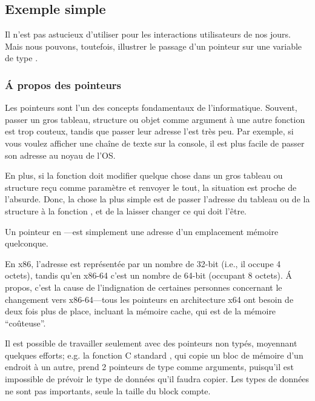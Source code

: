 \subsection{Exemple simple}



Il n'est pas astucieux d'utiliser \scanf pour les interactions utilisateurs de nos jours.
Mais nous pouvons, toutefois, illustrer le passage d'un pointeur sur une variable
de type \Tint.

\subsubsection{Á propos des pointeurs}
\myindex{\CLanguageElements!\Pointers}

Les pointeurs sont l'un des concepts fondamentaux de l'informatique.
Souvent, passer un gros tableau, structure ou objet comme argument à une autre fonction
est trop couteux, tandis que passer leur adresse l'est très peu.
Par exemple, si vous voulez afficher une chaîne de texte sur la console, il est
plus facile de passer son adresse au noyau de l'\ac{OS}.

En plus, si la fonction  doit modifier quelque chose dans
un gros tableau ou structure reçu comme paramètre et renvoyer le tout, la situation
est proche de l'absurde.
Donc, la chose la plus simple est de passer l'adresse du tableau ou de la structure
à la fonction , et de la laisser changer ce qui doit l'être.

Un pointeur en \CCpp---est simplement une adresse d'un emplacement mémoire quelconque.

En x86, l'adresse est représentée par un nombre de 32-bit (i.e., il occupe 4 octets),
tandis qu'en x86-64 c'est un nombre de 64-bit (occupant 8 octets).
Á propos, c'est la cause de l'indignation de certaines personnes concernant le
changement vers x86-64---tous les pointeurs en architecture x64 ont besoin de deux
fois plus de place, incluant la mémoire cache, qui est de la mémoire ``coûteuse''.

Il est possible de travailler seulement avec des pointeurs non typés, moyennant
quelques efforts; e.g. la fonction C standard , qui copie un bloc de
mémoire d'un endroit à un autre, prend 2 pointeurs de type  comme arguments,
puisqu'il est impossible de prévoir le type de données qu'il faudra copier. Les types
de données ne sont pas importants, seule la taille du block compte.

